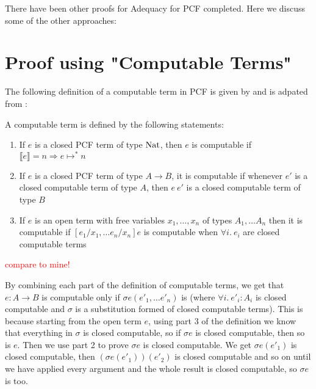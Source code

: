 There have been other proofs for Adequacy for PCF completed. Here we discuss some of the other approaches:

\section{Proof using "Computable Terms"}
The following definition of a computable term in PCF is given by \citep{Gunter92} and is adpated from \citep{Plotkin77}:

\vspace{0.5cm}

\begin{defn} A computable term is defined by the following statements:
\begin{enumerate}
\item{If $e$ is a closed PCF term of type $\operatorname{Nat}$, then $e$ is computable if $\llbracket e \rrbracket = n \Rightarrow e \mapsto^* n$}
\item{If $e$ is a closed PCF term of type $A \to B$, it is computable if whenever $e'$ is a closed computable term of type $A$, then $e \ e'$ is a closed computable term of type $B$}
\item{If $e$ is an open term with free variables $x_1, \dots, x_n$ of types $A_1, \dots A_n$ then it is computable if $[e_1/x_1, \dots e_n/x_n]e$ is computable when $\forall i. \ e_i$ are closed computable terms}
\end{enumerate}
\end{defn}  

\vspace{0.5cm}

\textcolor{red}{compare to mine!}



By combining each part of the definition of computable terms, we get that $e : A \to B$ is computable only if  $\sigma e(e'_1, \dots e'_n)$ is (where $\forall i. \ e'_i :  A_i$ is closed computable and $\sigma $ is a substitution formed of closed computable terms). This is because starting from the open term $e$, using part 3 of the definition we know that everything in $\sigma$ is closed computable, so if $\sigma e$ is closed computable, then so is $e$. Then we use part 2 to prove $\sigma e$ is closed computable. We get $\sigma e (e'_1)$ is closed computable, then $(\sigma e (e'_1))(e'_2)$ is closed computable and so on until we have applied every argument and the whole result is closed computable, so $\sigma e$ is too.

